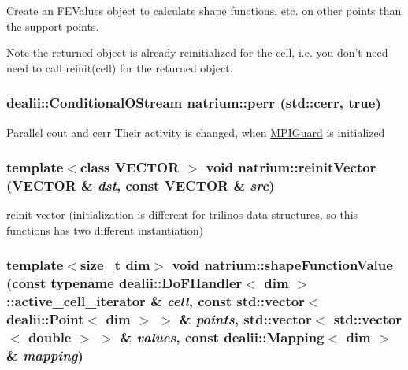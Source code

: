 Create an FEValues object to calculate shape functions, etc. on other points than the support points. \begin{DoxyNote}{Note}
the returned object is already reinitialized for the cell, i.e. you don't need need to call reinit(cell) for the returned object. 
\end{DoxyNote}
\hypertarget{namespacenatrium_a5493e61c5fe1935bc9975d78a24dceda}{
\subsubsection[{perr}]{\setlength{\rightskip}{0pt plus 5cm}dealii::ConditionalOStream {\bf natrium::perr} (std::cerr, \/  true)}}
\label{namespacenatrium_a5493e61c5fe1935bc9975d78a24dceda}
Parallel cout and cerr Their activity is changed, when \hyperlink{classnatrium_1_1MPIGuard}{MPIGuard} is initialized \hypertarget{namespacenatrium_a95eedd6a35d489da1b939928d8cf40e0}{
\subsubsection[{reinitVector}]{\setlength{\rightskip}{0pt plus 5cm}template$<$class VECTOR $>$ void natrium::reinitVector (VECTOR \& {\em dst}, \/  const VECTOR \& {\em src})}}
\label{namespacenatrium_a95eedd6a35d489da1b939928d8cf40e0}
reinit vector (initialization is different for trilinos data structures, so this functions has two different instantiation) \hypertarget{namespacenatrium_aa39b5925f0186ff601e4acae922d50e3}{
\subsubsection[{shapeFunctionValue}]{\setlength{\rightskip}{0pt plus 5cm}template$<$size\_\-t dim$>$ void natrium::shapeFunctionValue (const typename dealii::DoFHandler$<$ dim $>$::active\_\-cell\_\-iterator \& {\em cell}, \/  const std::vector$<$ dealii::Point$<$ dim $>$ $>$ \& {\em points}, \/  std::vector$<$ std::vector$<$ double $>$ $>$ \& {\em values}, \/  const dealii::Mapping$<$ dim $>$ \& {\em mapping})}}
\label{namespacenatrium_aa39b5925f0186ff601e4acae922d50e3}


